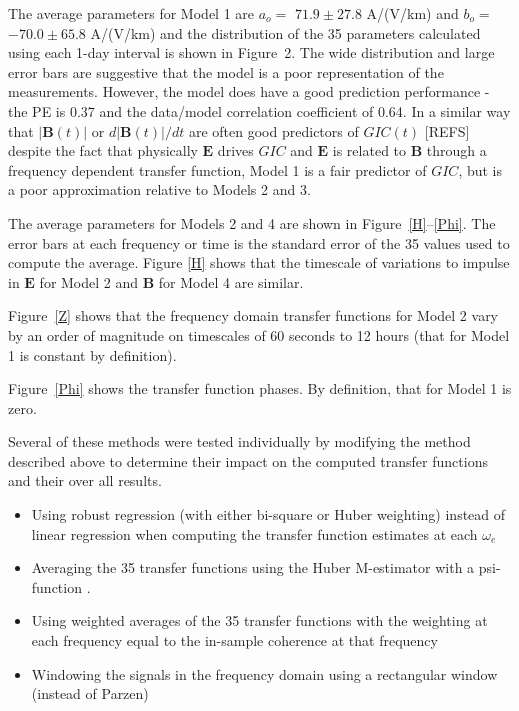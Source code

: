\documentclass[draft,linenumbers]{agujournal2018}
\begin{document}
The average parameters for Model 1 are $a_o =$ $71.9 \pm 27.8$ A/(V/km) and $b_o =$ $-70.0 \pm 65.8$ A/(V/km) and the distribution of the 35 parameters calculated using each 1-day interval is shown in Figure~2. The wide distribution and large error bars are suggestive that the model is a poor representation of the measurements. However, the model does have a good prediction performance - the PE is 0.37 and the data/model correlation coefficient of 0.64. In a similar way that $|\mathbf{B}(t)|$ or $d|\mathbf{B}(t)|/dt$ are often good predictors of $GIC(t)$ [REFS] despite the fact that physically $\mathbf{E}$ drives $GIC$ and $\mathbf{E}$ is related to $\mathbf{B}$ through a frequency dependent transfer function, Model 1 is a fair predictor of $GIC$, but is a poor approximation relative to Models 2 and 3.

The average parameters for Models 2 and 4 are shown in Figure~\ref{H}--\ref{Phi}. The error bars at each frequency or time is the standard error of the 35 values used to compute the average. Figure \ref{H} shows that the timescale of variations to impulse in $\mathbf{E}$ for Model 2 and $\mathbf{B}$ for Model 4 are similar.

Figure~\ref{Z} shows that the frequency domain transfer functions for Model 2 vary by an order of magnitude on timescales of 60 seconds to 12 hours (that for Model 1 is constant by definition).

Figure~\ref{Phi} shows the transfer function phases. By definition, that for Model 1 is zero.

Several of these methods were tested individually by modifying the method described above to determine their impact on the computed transfer functions and their over all results. 

\begin{itemize}
\item Using robust regression (with either bi-square or Huber weighting) instead of linear regression when computing the transfer function estimates at each $\omega_e$

\item Averaging the 35 transfer functions using the Huber M-estimator with a psi-function \citep{Huber2011}. 

\item Using weighted averages of the 35 transfer functions with the weighting at each frequency equal to the in-sample coherence at that frequency

\item Windowing the signals in the frequency domain using a rectangular window (instead of Parzen)
\end{itemize}
\end{document}
